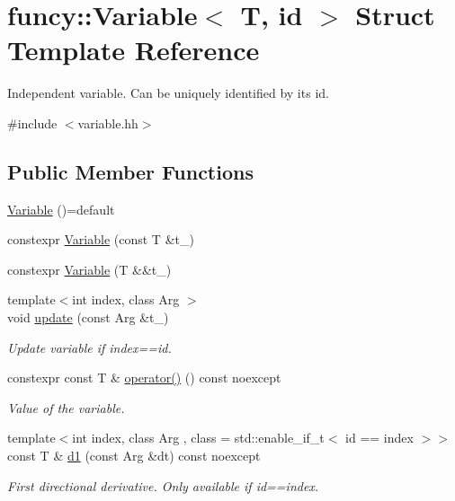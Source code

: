 \hypertarget{structfuncy_1_1Variable}{\section{funcy\-:\-:Variable$<$ T, id $>$ Struct Template Reference}
\label{structfuncy_1_1Variable}
}


Independent variable. Can be uniquely identified by its id.  




{\ttfamily \#include $<$variable.\-hh$>$}

\subsection*{Public Member Functions}
\begin{DoxyCompactItemize}
\item 
\hyperlink{structfuncy_1_1Variable_ac9e485d56f2d4c1d7fab0f510b3e68cc}{Variable} ()=default
\item 
constexpr \hyperlink{structfuncy_1_1Variable_a4da712098106f770a5e471d827c0e623}{Variable} (const T \&t\-\_\-)
\item 
constexpr \hyperlink{structfuncy_1_1Variable_ab7297e8d43f91a39ff130756f91a7614}{Variable} (T \&\&t\-\_\-)
\item 
{\footnotesize template$<$int index, class Arg $>$ }\\void \hyperlink{structfuncy_1_1Variable_acdbfd95572cdd732f1845099cfa0fe55}{update} (const Arg \&t\-\_\-)
\begin{DoxyCompactList}\small\item\em Update variable if index==id. \end{DoxyCompactList}\item 
constexpr const T \& \hyperlink{structfuncy_1_1Variable_a32a7d931ee1b45062773697b3eb4cae3}{operator()} () const noexcept
\begin{DoxyCompactList}\small\item\em Value of the variable. \end{DoxyCompactList}\item 
{\footnotesize template$<$int index, class Arg , class  = std\-::enable\-\_\-if\-\_\-t$<$ id == index $>$$>$ }\\const T \& \hyperlink{structfuncy_1_1Variable_aad5117eb57c1acca2bf9691b48feff52}{d1} (const Arg \&dt) const noexcept
\begin{DoxyCompactList}\small\item\em First directional derivative. Only available if id==index. \end{DoxyCompactList}\end{DoxyCompactItemize}


